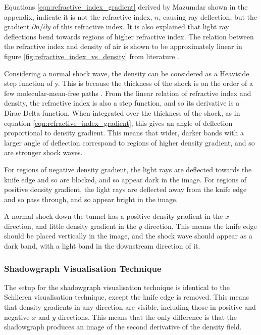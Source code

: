 \documentclass{article}
\begin{document}
Equations \ref{eqn:refractive_index_gradient} derived by Mazumdar \cite{Mazumdar_Amrita:2013} shown in the appendix, indicate it is not the refractive index, $n$, causing ray deflection, but the gradient $\partial n / \partial y$ of this refractive index.
It is also explained that light ray deflections bend towards regions of higher refractive index.
The relation between the refractive index and density of air is shown to be approximately linear in figure \ref{fig:refractive_index_vs_density} from literature \cite{refractiveindex_info} \cite{Ciddor:96}.

Considering a normal shock wave, the density can be considered as a Heaviside step function of y.
This is because the thickness of the shock is on the order of a few molecular-mean-free paths \cite{babinsky_delery:2011}.
From the linear relation of refractive index and density, the refractive index is also a step function, and so its derivative is a Dirac Delta function.
When integrated over the thickness of the shock, as in equation \ref{eqn:refractive_index_gradient}, this gives an angle of deflection proportional to density gradient.
This means that wider, darker bands with a larger angle of deflection correspond to regions of higher density gradient, and so are stronger shock waves.

For regions of negative density gradient, the light rays are deflected towards the knife edge and so are blocked, and so appear dark in the image.
For regions of positive density gradient, the light rays are deflected away from the knife edge and so pass through, and so appear bright in the image.

A normal shock down the tunnel has a positive density gradient in the $x$ direction, and little density gradient in the $y$ direction.
This means the knife edge should be placed vertically in the image, and the shock wave should appear as a dark band, with a light band in the downstream direction of it.

\subsubsection{Shadowgraph Visualisation Technique}

The setup for the shadowgraph visualisation technique is identical to the Schlieren visualisation technique, except the knife edge is removed.
This means that density gradients in any direction are visible, including those in positive and negative $x$ and $y$ directions.
This means that the only difference is that the shadowgraph produces an image of the second derivative of the density field.
\end{document}
